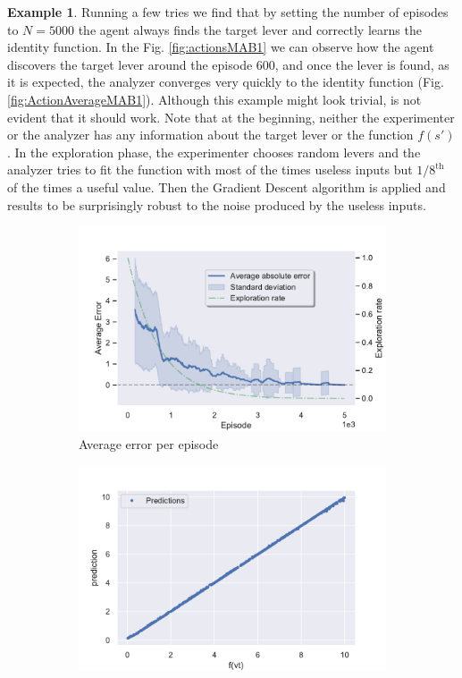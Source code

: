 \documentclass[11pt,a4paper,twoside]{report}
\newcommand{\+}{\textnormal{+} }
\theoremstyle{definition}
\newtheorem{myex}[mythm]{Example}
\numberwithin{equation}{chapter}
\begin{document}
\begin{myex}
    Running a few tries we find that by setting the number of episodes to
    $N=5000$ the agent always finds the target lever and correctly learns the
    identity function. In the Fig. \ref{fig:actionsMAB1} we can observe how the
    agent discovers the target lever around the episode 600, and once the lever
    is found, as it is expected, the analyzer converges very quickly to the
    identity function (Fig. \ref{fig:ActionAverageMAB1}). Although this example
    might look trivial, is not evident that it should work. Note that at
    the beginning, neither the experimenter or the analyzer has any information
    about the target lever or the function $f(s')$. In the exploration phase,
    the experimenter chooses random levers and the analyzer tries to fit the
    function with most of the times useless inputs but $1/8^{\text{th}}$ of the
    times a useful value. Then the Gradient Descent algorithm is applied and
    results to be surprisingly robust to the noise produced by the useless inputs.
    \begin{figure}[]
      \centering
      \begin{subfigure}{.5\textwidth}
        \centering
        \includegraphics[width=1\linewidth]{figures/Error-MAB1.pdf}
        \caption{Average error per episode}
        \label{fig:ErrorAverageMAB1}
      \end{subfigure}%
      \begin{subfigure}{.5\textwidth}
        \centering
        \includegraphics[width=1\linewidth]{figures/predictions-MAB1.pdf}

\end{subfigure}
\end{figure}
\end{myex}
\end{document}
